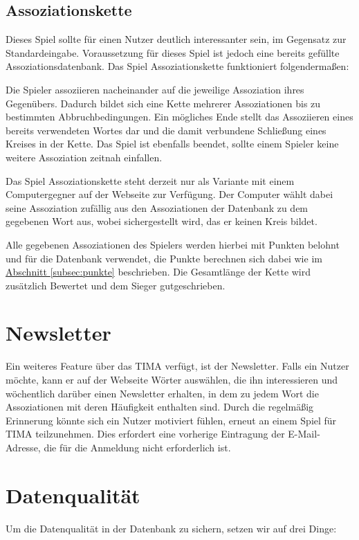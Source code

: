 \subsection{Assoziationskette}
Dieses Spiel sollte für einen Nutzer deutlich interessanter sein, im Gegensatz zur Standardeingabe. Voraussetzung für dieses Spiel ist jedoch eine bereits gefüllte
Assoziationsdatenbank. Das Spiel Assoziationskette funktioniert folgendermaßen:

Die Spieler assoziieren nacheinander auf die jeweilige Assoziation ihres
Gegenübers. Dadurch bildet sich eine Kette mehrerer Assoziationen bis
zu bestimmten Abbruchbedingungen. Ein mögliches Ende stellt das Assoziieren
eines bereits verwendeten Wortes dar und die damit verbundene Schließung eines
Kreises in der Kette. Das Spiel ist ebenfalls beendet, sollte einem Spieler
keine weitere Assoziation zeitnah einfallen.

Das Spiel Assoziationskette steht derzeit nur als Variante mit einem Computergegner auf der Webseite zur Verfügung. Der Computer wählt dabei seine Assoziation zufällig aus den Assoziationen der Datenbank zu dem gegebenen Wort aus, wobei sichergestellt wird, das er keinen Kreis bildet.

Alle gegebenen Assoziationen des Spielers werden hierbei mit Punkten belohnt
und für die Datenbank verwendet, die Punkte berechnen sich dabei wie im \hyperref[subsec:punkte]{Abschnitt \ref*{subsec:punkte}} beschrieben. Die Gesamtlänge der Kette wird zusätzlich Bewertet und dem Sieger gutgeschrieben.

\section{Newsletter}\label{subsec:newsletter}
Ein weiteres Feature über das TIMA verfügt, ist der Newsletter. Falls ein
Nutzer möchte, kann er auf der Webseite Wörter auswählen, die ihn
interessieren und wöchentlich darüber einen Newsletter erhalten, in dem zu
jedem Wort die Assoziationen mit deren Häufigkeit enthalten sind. Durch die
regelmäßig Erinnerung könnte sich ein Nutzer motiviert fühlen, erneut an einem
Spiel für TIMA teilzunehmen. Dies erfordert eine vorherige Eintragung der E-Mail-Adresse, die für die Anmeldung nicht erforderlich ist.

\section{Datenqualität}
Um die Datenqualität  in der Datenbank zu sichern, setzen wir auf drei Dinge:

